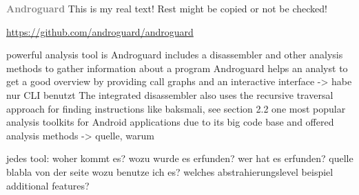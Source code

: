\newline\newline\textbf{\textcolor{gray}{Androguard}}\newline
This is my real text! Rest might be copied or not be checked!


\url{https://github.com/androguard/androguard}

powerful analysis tool is Androguard\newline
includes a disassembler and other analysis methods to gather information about a program\newline
Androguard helps an analyst to get a good overview by providing call graphs and an interactive interface -> habe nur CLI benutzt\newline
The integrated disassembler also uses the recursive traversal approach for finding instructions like baksmali, see section 2.2\newline
one most popular analysis toolkits for Android applications due to its big code base and offered analysis methods -> quelle, warum\newline


jedes tool:\newline
woher kommt es?\newline
wozu wurde es erfunden?\newline
wer hat es erfunden? quelle\newline
blabla von der seite\newline
wozu benutze ich es?\newline
welches abstrahierungslevel\newline
beispiel\newline
additional features?\newline
